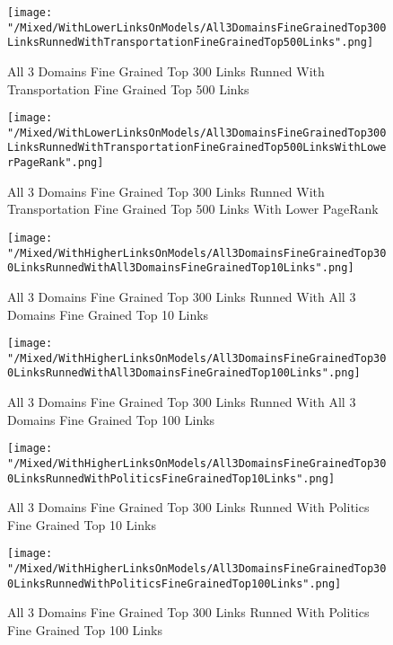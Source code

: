 \documentclass[thesis=M,english]{FITthesis}[2012/10/20]
\begin{document}
	\begin{figure}\centering
		\texttt{[image: "/Mixed/WithLowerLinksOnModels/All3DomainsFineGrainedTop300LinksRunnedWithTransportationFineGrainedTop500Links".png]}
		\caption{All 3 Domains Fine Grained Top 300 Links Runned With Transportation Fine Grained Top 500 Links}\label{}
	\end{figure}
	
	\begin{figure}\centering
		\texttt{[image: "/Mixed/WithLowerLinksOnModels/All3DomainsFineGrainedTop300LinksRunnedWithTransportationFineGrainedTop500LinksWithLowerPageRank".png]}
		\caption{All 3 Domains Fine Grained Top 300 Links Runned With Transportation Fine Grained Top 500 Links With Lower PageRank}\label{}
	\end{figure}
	\begin{figure}\centering
		\texttt{[image: "/Mixed/WithHigherLinksOnModels/All3DomainsFineGrainedTop300LinksRunnedWithAll3DomainsFineGrainedTop10Links".png]}
		\caption{All 3 Domains Fine Grained Top 300 Links Runned With All 3 Domains Fine Grained Top 10 Links}\label{}
	\end{figure}
	
	\begin{figure}\centering
		\texttt{[image: "/Mixed/WithHigherLinksOnModels/All3DomainsFineGrainedTop300LinksRunnedWithAll3DomainsFineGrainedTop100Links".png]}
		\caption{All 3 Domains Fine Grained Top 300 Links Runned With All 3 Domains Fine Grained Top 100 Links}\label{}
	\end{figure}
	
		
	\begin{figure}\centering
		\texttt{[image: "/Mixed/WithHigherLinksOnModels/All3DomainsFineGrainedTop300LinksRunnedWithPoliticsFineGrainedTop10Links".png]}
		\caption{All 3 Domains Fine Grained Top 300 Links Runned With Politics Fine Grained Top 10 Links}\label{}
	\end{figure}
		
		
	\begin{figure}\centering
		\texttt{[image: "/Mixed/WithHigherLinksOnModels/All3DomainsFineGrainedTop300LinksRunnedWithPoliticsFineGrainedTop100Links".png]}
		\caption{All 3 Domains Fine Grained Top 300 Links Runned With Politics Fine Grained Top 100 Links}\label{}
	\end{figure}
	
\end{document}
